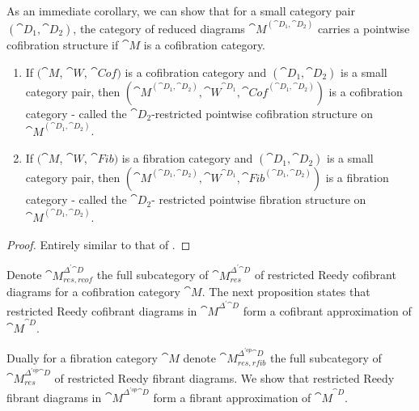 As an immediate corollary, we can show that for a small category pair $({\cat D}_1, {\cat D}_2)$, the category of reduced diagrams ${\cat M}^{({\cat D}_1, {\cat D}_2)}$ carries a pointwise cofibration structure if ${\cat M}$ is a cofibration category.

\begin{thm}
\label{thm:generalpointwisecofibstruct2}
\mbox{}
\begin{enumerate}
\item
If $({\cat M}$, ${\cat W}$, ${\cat Cof})$ is a cofibration category and $({\cat D}_1, {\cat D}_2)$ is a small category pair, then $({\cat M}^{({\cat D}_1, {\cat D}_2)} , {\cat W}^{{\cat D}_1}, {\cat Cof}^{({\cat D}_1, {\cat D}_2)})$ is a cofibration category - called the ${\cat D}_2$-restricted pointwise cofibration structure on ${\cat M}^{({\cat D}_1, {\cat D}_2)}$.
\item
If $({\cat M}$, ${\cat W}$, ${\cat Fib})$ is a fibration category and $({\cat D}_1, {\cat D}_2)$ is a small category pair, then $({\cat M}^{({\cat D}_1, {\cat D}_2)} , {\cat W}^{{\cat D}_1}, {\cat Fib}^{({\cat D}_1, {\cat D}_2)})$ is a fibration category - called the ${\cat D}_2$- restricted pointwise fibration structure on ${\cat M}^{({\cat D}_1, {\cat D}_2)}$.
\end{enumerate}
\end{thm}

\begin{proof}
Entirely similar to that of .
\end{proof}

Denote ${\cat M}^{\Delta^{'}{\cat D}}_{res, rcof}$ the full subcategory of ${\cat M}^{\Delta^{'}{\cat D}}_{res}$ of restricted Reedy cofibrant diagrams for a cofibration category ${\cat M}$. The next proposition states that restricted Reedy cofibrant diagrams in ${\cat M}^{\Delta^{'}{\cat D}}$ form a cofibrant approximation of ${\cat M}^{\cat D}$. 

Dually for a fibration category ${\cat M}$ denote ${\cat M}^{\Delta^{'op}{\cat D}}_{res, rfib}$ the full subcategory of ${\cat M}^{\Delta^{'op}{\cat D}}_{res}$ of restricted Reedy fibrant diagrams. We show that restricted Reedy fibrant diagrams in ${\cat M}^{\Delta^{'op}{\cat D}}$ form a fibrant approximation of ${\cat M}^{\cat D}$.

